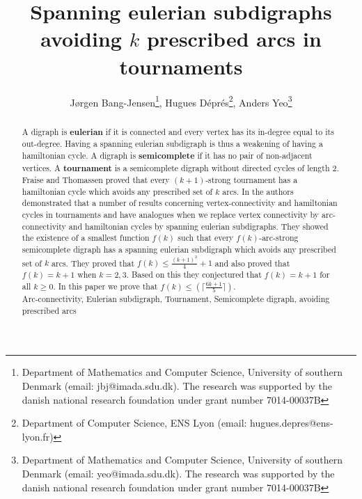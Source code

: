 \documentclass{article}
\newcommand{\2}{\vspace{2mm}}
\theoremstyle{plain}
\theoremstyle{definition}
\begin{document}


\title{Spanning eulerian subdigraphs avoiding $k$ prescribed arcs in tournaments}
\author{J\o{}rgen Bang-Jensen\thanks{Department of Mathematics and Computer Science, University of southern Denmark (email: jbj@imada.sdu.dk). The research was supported by the danish national research foundation under grant number 7014-00037B}, Hugues D\'epr\'es\thanks{Department of Computer Science, ENS Lyon (email: hugues.depres@ens-lyon.fr)}, Anders Yeo\thanks{Department of Mathematics and Computer Science, University of southern Denmark (email: yeo@imada.sdu.dk). The research was supported by the danish national research foundation under grant number 7014-00037B}}

\maketitle


\begin{abstract}
  A digraph is {\bf eulerian} if it is connected and every vertex has its in-degree equal to its out-degree. 
  Having a spanning eulerian subdigraph is thus a weakening of having a hamiltonian cycle.
  A digraph is {\bf semicomplete} if it has no pair of non-adjacent vertices. A {\bf tournament} is a semicomplete digraph without directed cycles of length 2.
 Fraise and Thomassen \cite{fraisseGC3} proved that every $(k+1)$-strong tournament has a hamiltonian cycle which avoids any prescribed set of $k$ arcs. In \cite{bangsupereuler} the authors demonstrated that a number of results concerning vertex-connectivity and hamiltonian cycles in tournaments and  have analogues when we replace vertex connectivity by arc-connectivity and hamiltonian cycles by spanning eulerian subdigraphs. They  showed the existence of a smallest function $f(k)$ such that every $f(k)$-arc-strong semicomplete digraph has a spanning eulerian subdigraph which avoids any prescribed set of $k$ arcs. They proved that $f(k)\leq \frac{(k+1)^2}{4}+1$ and also proved that $f(k)=k+1$ when $k=2,3$. Based on this they conjectured that $f(k)=k+1$ for all $k\geq 0$. In this paper we prove that $f(k)\leq (\lceil\frac{6k+1}{5}\rceil)$.\\

  Arc-connectivity, Eulerian subdigraph, Tournament, Semicomplete digraph, avoiding prescribed arcs
\end{abstract}
\end{document}
